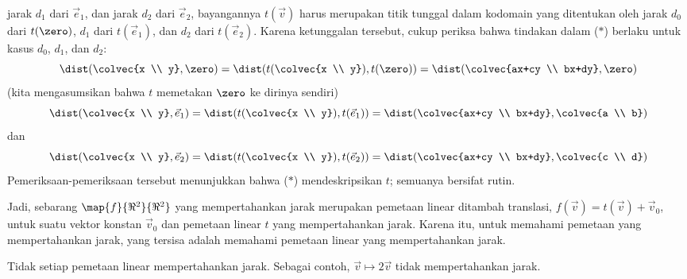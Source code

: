 jarak $d_1$ dari $\vec{e}_1$, dan jarak $d_2$ dari $\vec{e}_2$, bayangannya
$t(\vec{v})$ harus merupakan titik tunggal dalam kodomain yang ditentukan oleh
jarak $d_0$ dari $t(\zero)$, $d_1$ dari $t(\vec{e}_1)$, dan $d_2$ dari
$t(\vec{e}_2)$.
Karena ketunggalan tersebut, cukup periksa bahwa tindakan dalam ($*$) berlaku
untuk kasus $d_0$, $d_1$, dan $d_2$:
\begin{equation*}
  \dist(\colvec{x \\ y},\zero) 
  =\dist(t(\colvec{x \\ y}),t(\zero))
  =\dist(\colvec{ax+cy \\ bx+dy},\zero)
\end{equation*}
(kita mengasumsikan bahwa $t$ memetakan $\zero$ ke dirinya sendiri)
\begin{equation*}
  \dist(\colvec{x \\ y},\vec{e}_1)
  =\dist(t(\colvec{x \\ y}),t(\vec{e}_1))
  =\dist(\colvec{ax+cy \\ bx+dy},\colvec{a \\ b})  
\end{equation*}
dan
\begin{equation*}
  \dist(\colvec{x \\ y},\vec{e}_2)
  =\dist(t(\colvec{x \\ y}),t(\vec{e}_2))
  =\dist(\colvec{ax+cy \\ bx+dy},\colvec{c \\ d})
\end{equation*}
Pemeriksaan-pemeriksaan tersebut menunjukkan bahwa ($*$) mendeskripsikan $t$;
semuanya bersifat rutin.

Jadi, sebarang $\map{f}{\Re^2}{\Re^2}$ yang mempertahankan jarak merupakan
pemetaan linear ditambah translasi,
$f(\vec{v})=t(\vec{v})+\vec{v}_0$, untuk suatu vektor konstan $\vec{v}_0$ dan
pemetaan linear $t$ yang mempertahankan jarak.
Karena itu, untuk memahami pemetaan yang mempertahankan jarak, yang tersisa
adalah memahami pemetaan linear yang mempertahankan jarak.

Tidak setiap pemetaan linear mempertahankan jarak.
Sebagai contoh, $\vec{v}\mapsto 2\vec{v}$ tidak mempertahankan jarak.

